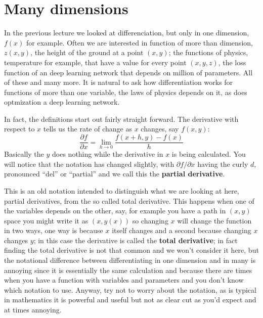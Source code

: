 \documentclass[12pt]{article}
\begin{document}
\section*{Many dimensions}

In the previous lecture we looked at differenciation, but only in one
dimension, $f(x)$ for example. Often we are interested in function of
more than dimension, $z(x,y)$, the height of the ground at a point
$(x,y)$; the functions of physics, temperature for example, that have
a value for every point $(x,y,z)$, the loss function of an deep
learning network that depends on million of parameters. All of these
and many more. It is natural to ask how differentiation works for
functions of more than one variable, the laws of physics depends on
it, as does optmization a deep learning network.

In fact, the definitions start out fairly straight forward. The derivative with respect to $x$ tells us the rate of change as $x$ changes, say $f(x,y)$:
\begin{equation}
  \frac{\partial f}{\partial x}=\lim_{h\rightarrow 0}\frac{f(x+h,y)-f(x)}{h}
\end{equation}
Basically the $y$ does nothing while the derivative in $x$ is being
calculated. You will notice that the notation has changed slightly,
with $\partial f/\partial x$ having the curly $d$, pronounced ``del''
or ``partial'' and we call this the \textbf{partial derivative}.

This is an old notation intended to distinguish what we are looking at
here, partial derivatives, from the so called total derivative. This
happens when one of the variables depends on the other, say, for
example you have a path in $(x,y)$ space you might write it as
$(x,y(x))$ so changing $x$ will change the function in two ways, one
way is because $x$ itself changes and a second because changing $x$
changes $y$; in this case the derivative is called the \textbf{total
  derivative}; in fact finding the total derivative is not that common
and we won't consider it here, but the notational difference between
differentiating in one dimension and in many is annoying since it is
essentially the same calculation and because there are times when you
have a function with variables and parameters and you don't know which
notation to use. Anyway, try not to worry about the notation, as is
typical in mathematics it is powerful and useful but not as clear cut
as you'd expect and at times annoying.
\end{document}
